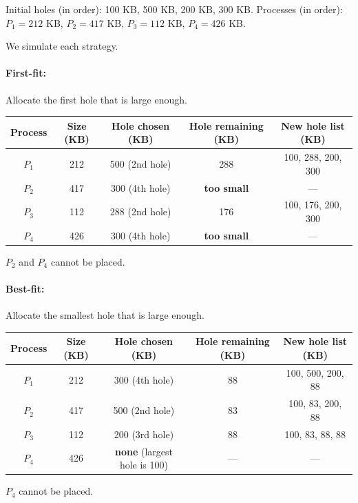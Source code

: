 \documentclass[11pt]{article}
\begin{document}
\begin{corrige}
Initial holes (in order): 100 KB, 500 KB, 200 KB, 300 KB.  
Processes (in order): $P_1=212$ KB, $P_2=417$ KB, $P_3=112$ KB, $P_4=426$ KB.

We simulate each strategy.

\paragraph{First-fit:} Allocate the first hole that is large enough.
\begin{center}
\begin{tabular}{|c|c|c|c|c|}
\hline
Process & Size (KB) & Hole chosen (KB) & Hole remaining (KB) & New hole list (KB) \\
\hline
$P_1$ & 212 & 500 (2nd hole) & 288 & 100, 288, 200, 300 \\
$P_2$ & 417 & 300 (4th hole) & \textbf{too small} & — \\
$P_3$ & 112 & 288 (2nd hole) & 176 & 100, 176, 200, 300 \\
$P_4$ & 426 & 300 (4th hole) & \textbf{too small} & — \\
\hline
\end{tabular}
\end{center}
$P_2$ and $P_4$ cannot be placed.

\paragraph{Best-fit:} Allocate the smallest hole that is large enough.
\begin{center}
\begin{tabular}{|c|c|c|c|c|}
\hline
Process & Size (KB) & Hole chosen (KB) & Hole remaining (KB) & New hole list (KB) \\
\hline
$P_1$ & 212 & 300 (4th hole) & 88 & 100, 500, 200, 88 \\
$P_2$ & 417 & 500 (2nd hole) & 83 & 100, 83, 200, 88 \\
$P_3$ & 112 & 200 (3rd hole) & 88 & 100, 83, 88, 88 \\
$P_4$ & 426 & \textbf{none} (largest hole is 100) & — & — \\
\hline
\end{tabular}
\end{center}
$P_4$ cannot be placed.


\end{corrige}
\end{document}
